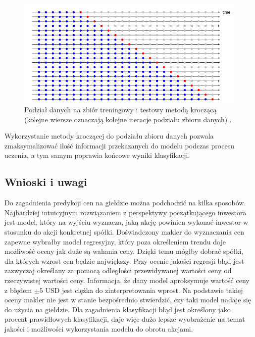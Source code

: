 \documentclass[a4paper, twoside, 11pt, openright]{article}
\begin{document}
\begin{figure}[H]
\centering 
\includegraphics[scale=0.75]{img/train_test_split_time_series.png}
\caption{Podział danych na zbiór treningowy i testowy metodą kroczącą (kolejne wiersze oznaczają kolejne iteracje podziału zbioru danych) \cite{train_test_split_time_series}.}
\label{img:train_test_split_time_series}
\end{figure}

Wykorzystanie metody kroczącej do podziału zbioru danych pozwala zmaksymalizować ilość informacji przekazanych do modelu podczas procesu uczenia, a tym samym poprawia końcowe wyniki klasyfikacji. 


\subsection{Wnioski i uwagi}

Do zagadnienia predykcji cen na giełdzie można podchodzić na kilka sposobów. Najbardziej intuicyjnym rozwiązaniem z perspektywy początkującego inwestora jest model, który na wyjściu wyznacza, jaką akcję powinien wykonać inwestor w stosunku do akcji konkretnej spółki. Doświadczony makler do wyznaczania cen zapewne wybrałby model regresyjny, który poza określeniem trendu daje możliwość oceny jak duże są wahania ceny. Dzięki temu mógłby dobrać spółki, dla których wzrost cen będzie największy. Przy ocenie jakości regresji błąd jest zazwyczaj określany za pomocą odległości przewidywanej wartości ceny od rzeczywistej wartości ceny. Informacja, że dany model aproksymuje wartość ceny z błędem $\pm 5$ USD jest ciężka do zinterpretowania wprost. Na podstawie takiej oceny makler nie jest w stanie bezpośrednio stwierdzić, czy taki model nadaje się do użycia na giełdzie. Dla zagadnienia klasyfikacji błąd jest określony jako procent prawidłowych klasyfikacji, daje więc dużo lepsze wyobrażenie na temat jakości i możliwości wykorzystania modelu do obrotu akcjami.
\end{document}

